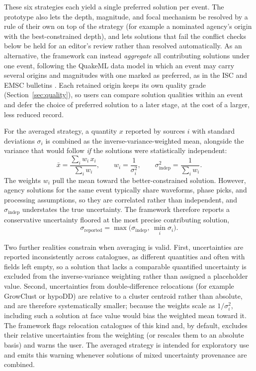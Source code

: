 \documentclass[11pt]{article}
\begin{document}
These six strategies each yield a single preferred solution per event. The prototype also lets the depth, magnitude, and focal mechanism be resolved by a rule of their own on top of the strategy (for example a nominated agency's origin with the best-constrained depth), and lets solutions that fail the conflict checks below be held for an editor's review rather than resolved automatically. As an alternative, the framework can instead \emph{aggregate} all contributing solutions under one event, following the QuakeML data model in which an event may carry several origins and magnitudes with one marked as preferred, as in the ISC and EMSC bulletins \citep{isc_data_collection, emsc_webservices}. Each retained origin keeps its own quality grade (Section~\ref{sec:quality}), so users can compare solution qualities within an event and defer the choice of preferred solution to a later stage, at the cost of a larger, less reduced record.

For the averaged strategy, a quantity $x$ reported by sources $i$ with standard deviations $\sigma_i$ is combined as the inverse-variance-weighted mean, alongside the variance that would follow \emph{if} the solutions were statistically independent:
\begin{equation*}
\bar{x} = \frac{\sum_i w_i\,x_i}{\sum_i w_i}, \qquad
w_i = \frac{1}{\sigma_i^{2}}, \qquad
\sigma_{\text{indep}}^{2} = \frac{1}{\sum_i w_i}.
\end{equation*}
The weights $w_i$ pull the mean toward the better-constrained solution. However, agency solutions for the same event typically share waveforms, phase picks, and processing assumptions, so they are correlated rather than independent, and $\sigma_{\text{indep}}$ understates the true uncertainty. The framework therefore reports a conservative uncertainty floored at the most precise contributing solution,
\begin{equation*}
\sigma_{\text{reported}} = \max\!\bigl(\sigma_{\text{indep}},\ \min_i \sigma_i\bigr).
\end{equation*}

Two further realities constrain when averaging is valid. First, uncertainties are reported inconsistently across catalogues, as different quantities and often with fields left empty, so a solution that lacks a comparable quantified uncertainty is excluded from the inverse-variance weighting rather than assigned a placeholder value. Second, uncertainties from double-difference relocations (for example GrowClust or hypoDD) are relative to a cluster centroid rather than absolute, and are therefore systematically smaller; because the weights scale as $1/\sigma_i^{2}$, including such a solution at face value would bias the weighted mean toward it. The framework flags relocation catalogues of this kind and, by default, excludes their relative uncertainties from the weighting (or rescales them to an absolute basis) and warns the user. The averaged strategy is intended for exploratory use and emits this warning whenever solutions of mixed uncertainty provenance are combined.
\end{document}
